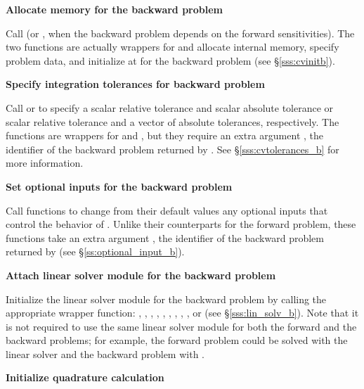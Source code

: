 \begin{Steps}
\item
  {\bf Allocate memory for the backward problem}

  Call  (or , when the backward problem depends on the
  forward sensitivities). The two functions are actually wrappers for  
  and allocate internal memory, specify problem data, and initialize {\cvodes} 
  at  for the backward problem (see \S\ref{sss:cvinitb}).

\item 
  {\bf Specify integration tolerances for backward problem}
  
  Call  or 
  to specify a scalar relative tolerance and scalar absolute tolerance or
  scalar relative tolerance and a vector of absolute tolerances, respectively.
  The functions are wrappers for  and
  , but they require an extra argument ,
  the identifier of the backward problem returned by .
  See \S\ref{sss:cvtolerances_b} for more information.


\item
  {\bf Set optional inputs for the backward problem}

  Call  functions to change from their default values
  any optional inputs that control the behavior of {\cvodes}. Unlike
  their counterparts for the forward problem, these functions take an
  extra argument , the identifier of the backward problem returned 
  by  (see \S\ref{ss:optional_input_b}).


\item \label{i:lin_solverB}
  {\bf Attach linear solver module for the backward problem}

  Initialize the linear solver module 
  for the backward problem by calling the appropriate wrapper
  function: , , , ,
  , , , ,
  , or  (see \S\ref{sss:lin_solv_b}).  Note that
  it is not required to use the same linear solver module for both the forward 
  and the backward problems; for example, the forward problem could be solved
  with the {\cvdense} linear solver and the backward problem with {\cvspgmr}.

\item \label{i:quadB}
  {\bf Initialize quadrature calculation}


\end{Steps}
